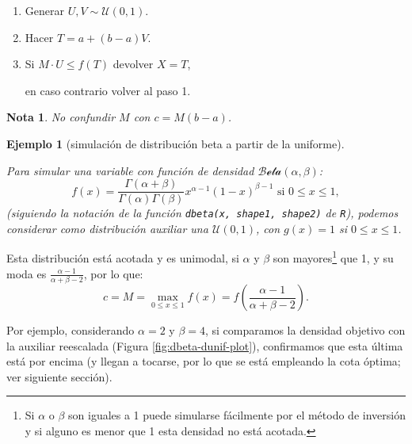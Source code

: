 \documentclass[
  spanish,
  10pt,
]{book}
\theoremstyle{break}
\newtheorem{example}{Ejemplo}[chapter]
\theoremstyle{nonumberplain}
\newtheorem{remark}{Nota}
\let\oldfootnote\footnote
\renewcommand\footnote[1]{\oldfootnote{\hspace{2mm}#1}}
\begin{document}
\begin{enumerate}
\def\labelenumi{\arabic{enumi}.}
\item
  Generar \(U,V\sim \mathcal{U}(0, 1)\).
\item
  Hacer \(T = a + \left( b-a \right) V\).
\item
  Si \(M \cdot U\leq f\left( T \right)\)
  devolver \(X = T\),

  en caso contrario volver al paso 1.
\end{enumerate}

\begin{remark}
No confundir \(M\) con \(c = M \left( b - a \right)\).
\end{remark}

\begin{example}[simulación de distribución beta a partir de la uniforme]
\protect\hypertarget{exm:dbeta-dunif-ar}{}\label{exm:dbeta-dunif-ar}

Para simular una variable con función de densidad \(\mathcal{Beta}(\alpha, \beta)\):
\[f(x)=\frac{\Gamma (\alpha + \beta )}{\Gamma (\alpha )\Gamma (\beta )}
x^{\alpha -1}(1-x)^{\beta -1}\text{ si }0 \leq x \leq 1,\]
(siguiendo la notación de la función \texttt{dbeta(x,\ shape1,\ shape2)} de \texttt{R}), podemos considerar como distribución auxiliar una \(\mathcal{U}(0,1)\),
con \(g(x) = 1\) si \(0 \leq x \leq 1\).
\end{example}

Esta distribución está acotada y es unimodal, si \(\alpha\) y \(\beta\) son mayores\footnote{Si \(\alpha\) o \(\beta\) son iguales a 1 puede simularse fácilmente por el método de inversión y si alguno es menor que 1 esta densidad no está acotada.} que 1, y su moda es \(\frac{\alpha - 1} {\alpha + \beta - 2}\), por lo que:
\[c = M = \max_{0 \leq x \leq 1}f(x) = f\left( \frac{\alpha - 1} {\alpha + \beta - 2} \right).\]

Por ejemplo, considerando \(\alpha = 2\) y \(\beta = 4\), si comparamos la densidad objetivo con la auxiliar reescalada (Figura \ref{fig:dbeta-dunif-plot}), confirmamos que esta última está por encima (y llegan a tocarse, por lo que se está empleando la cota óptima; ver siguiente sección).
\end{document}

